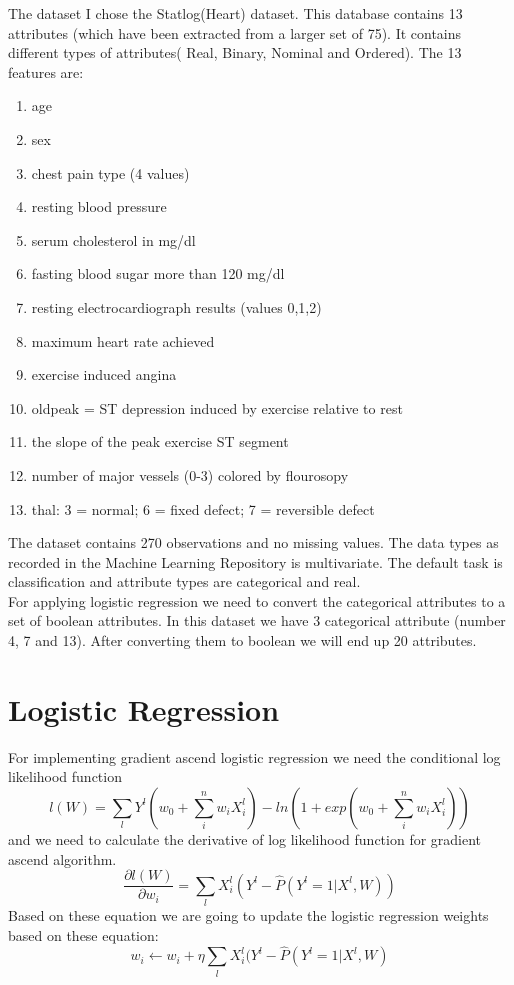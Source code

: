 \documentclass[12pt]{article}
\begin{document}
{The dataset}
I chose the Statlog(Heart) dataset. This database contains 13 attributes (which have been extracted from a larger set of 75). It contains different types of attributes( Real, Binary, Nominal and Ordered). The 13 features are:
\begin{enumerate}
\item age
\item sex
\item chest pain type  (4 values)
\item resting blood pressure
\item serum cholesterol in mg/dl
\item fasting blood sugar more than 120 mg/dl
\item resting electrocardiograph results  (values 0,1,2)
\item maximum heart rate achieved
\item exercise induced angina
\item  oldpeak = ST depression induced by exercise relative to rest
\item the slope of the peak exercise ST segment
\item number of major vessels (0-3) colored by flourosopy
\item  thal: 3 = normal; 6 = fixed defect; 7 = reversible defect
\end{enumerate}

The dataset contains 270 observations and no missing values. The data types as recorded in the Machine Learning Repository is multivariate. The default task is classification and attribute types are categorical and real.\\
For applying logistic regression we need to convert the categorical attributes to a set of boolean attributes. In this dataset we have 3 categorical attribute (number 4, 7 and 13). After converting them to boolean we will end up 20 attributes.
\newpage
\section{Logistic Regression}
For implementing gradient ascend logistic regression we need the conditional log likelihood function
\begin{equation}\label{likelihood}
	l(W)=\sum\limits_{l}Y^l(w_0+\sum\limits_{i}^n w_iX_i^l)-ln(1+exp(w_0+\sum\limits_{i}^n w_iX_i^l))
\end{equation}
and we need to calculate the derivative of log likelihood function for gradient ascend algorithm.
\begin{equation}\label{derivative}
	\frac{\partial l(W)}{\partial w_i} = \sum\limits_{l} X_i^l(Y^l-\hat{P}(Y^l=1|X^l,W))
\end{equation}
Based on these equation we are going to update the logistic regression weights based on these equation:
\begin{equation}\label{update_rule}
	w_i \leftarrow w_i + \eta\sum\limits_{l} X_i^l(Y^l-\hat{P}(Y^l=1|X^l,W)
\end{equation}
\end{document}
